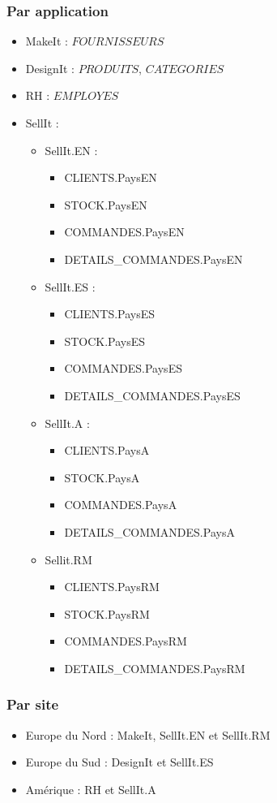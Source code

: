 \documentclass[10pt,a4paper,twoside]{article}
\begin{document}
\subsubsection{Par application}
\begin{itemize}
\item MakeIt : $FOURNISSEURS$
\item DesignIt : $PRODUITS$, $CATEGORIES$
\item RH : $EMPLOYES$
\item SellIt :
\begin{itemize}
\item SellIt.EN :
\begin{itemize}
\item CLIENTS.PaysEN
\item STOCK.PaysEN
\item COMMANDES.PaysEN
\item DETAILS\_COMMANDES.PaysEN
\end{itemize}
\item SellIt.ES :
\begin{itemize}
\item CLIENTS.PaysES
\item STOCK.PaysES
\item COMMANDES.PaysES
\item DETAILS\_COMMANDES.PaysES
\end{itemize}
\item SellIt.A :
\begin{itemize}
\item CLIENTS.PaysA
\item STOCK.PaysA
\item COMMANDES.PaysA
\item DETAILS\_COMMANDES.PaysA
\end{itemize}
\item Sellit.RM
\begin{itemize}
\item CLIENTS.PaysRM
\item STOCK.PaysRM
\item COMMANDES.PaysRM
\item DETAILS\_COMMANDES.PaysRM
\end{itemize}
\end{itemize}
\end{itemize}

\subsubsection{Par site}
\begin{itemize}
\item Europe du Nord : MakeIt, SellIt.EN et SellIt.RM
\item Europe du Sud : DesignIt et SellIt.ES
\item Amérique : RH et SellIt.A
\end{itemize}
\end{document}
